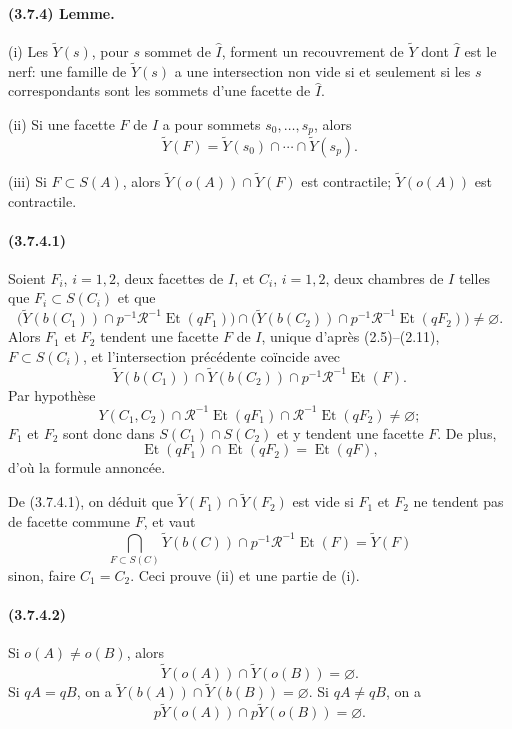 \documentclass[10pt]{article}
\begin{document}
\paragraph{(3.7.4) Lemme.} (i) Les \(\widetilde Y(s)\), pour \(s\) sommet de \(\widehat I\), forment un recouvrement de \(\widetilde Y\) dont \(\widehat I\) est le nerf: une famille de \(\widetilde Y(s)\) a une intersection non vide si et seulement si les \(s\) correspondants sont les sommets d'une facette de \(\widehat I\).

(ii) Si une facette \(F\) de \(I\) a pour sommets \(s_0,\ldots,s_p\), alors
\[
\widetilde Y(F)=\widetilde Y(s_0)\cap\cdots\cap\widetilde Y(s_p).
\]

(iii) Si \(F\subset S(A)\), alors \(\widetilde Y(o(A))\cap\widetilde Y(F)\) est contractile; \(\widetilde Y(o(A))\) est contractile.

\paragraph{(3.7.4.1)} Soient \(F_i\), \(i=1,2\), deux facettes de \(I\), et \(C_i\), \(i=1,2\), deux chambres de \(I\) telles que \(F_i\subset S(C_i)\) et que
\[
\bigl(\widetilde Y(b(C_1))\cap p^{-1}\mathcal R^{-1}\operatorname{Et}(qF_1)\bigr)
\cap
\bigl(\widetilde Y(b(C_2))\cap p^{-1}\mathcal R^{-1}\operatorname{Et}(qF_2)\bigr)
\ne\varnothing.
\]
Alors \(F_1\) et \(F_2\) tendent une facette \(F\) de \(I\), unique d'après (2.5)--(2.11), \(F\subset S(C_i)\), et l'intersection précédente coïncide avec
\[
\widetilde Y(b(C_1))\cap \widetilde Y(b(C_2))
\cap p^{-1}\mathcal R^{-1}\operatorname{Et}(F).
\]
Par hypothèse
\[
Y(C_1,C_2)\cap\mathcal R^{-1}\operatorname{Et}(qF_1)\cap
\mathcal R^{-1}\operatorname{Et}(qF_2)\ne\varnothing;
\]
\(F_1\) et \(F_2\) sont donc dans \(S(C_1)\cap S(C_2)\) et y tendent une facette \(F\). De plus,
\[
\operatorname{Et}(qF_1)\cap\operatorname{Et}(qF_2)=\operatorname{Et}(qF),
\]
d'où la formule annoncée.

De (3.7.4.1), on déduit que \(\widetilde Y(F_1)\cap\widetilde Y(F_2)\) est vide si \(F_1\) et \(F_2\) ne tendent pas de facette commune \(F\), et vaut
\[
\bigcap_{F\subset S(C)}
\widetilde Y(b(C))\cap p^{-1}\mathcal R^{-1}\operatorname{Et}(F)
=\widetilde Y(F)
\]
sinon, faire \(C_1=C_2\). Ceci prouve (ii) et une partie de (i).

\paragraph{(3.7.4.2)} Si \(o(A)\ne o(B)\), alors
\[
\widetilde Y(o(A))\cap\widetilde Y(o(B))=\varnothing.
\]
Si \(qA=qB\), on a \(\widetilde Y(b(A))\cap \widetilde Y(b(B))=\varnothing\). Si \(qA\ne qB\), on a
\[
p\widetilde Y(o(A))\cap p\widetilde Y(o(B))=\varnothing.
\]
\end{document}
